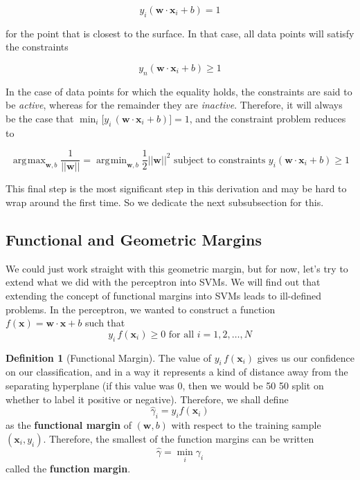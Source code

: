 \documentclass{article}
\DeclareMathOperator*{\argmin}{\arg\!\min}
\DeclareMathOperator*{\argmax}{\arg\!\max}
\theoremstyle{definition}
\newtheorem{definition}{Definition}[section]
\begin{document}
  \begin{equation*}
    y_i ( \mathbf{w} \cdot \mathbf{x}_i + b ) = 1 
  \end{equation*}
  
  for the point that is closest to the surface. In that case, all data points will satisfy the constraints 

  \begin{equation*}
    y_n (\mathbf{w} \cdot \mathbf{x}_i + b) \geq 1
  \end{equation*}

  In the case of data points for which the equality holds, the constraints are said to be \textit{active}, whereas for the remainder they are \textit{inactive}. Therefore, it will always be the case that $\min_i \big[ y_i \, (\mathbf{w} \cdot \mathbf{x}_i + b)\big] = 1$, and the constraint problem reduces to 

  \begin{equation*}
    \argmax_{\mathbf{w}, b} \frac{1}{||\mathbf{w}||} = \argmin_{\mathbf{w}, b} \frac{1}{2} ||\mathbf{w}||^2 \text{ subject to constraints } y_i (\mathbf{w} \cdot \mathbf{x}_i + b) \geq 1 
  \end{equation*}

  This final step is the most significant step in this derivation and may be hard to wrap around the first time. So we dedicate the next subsubsection for this. 

  \subsection{Functional and Geometric Margins} 

  We could just work straight with this geometric margin, but for now, let's try to extend what we did with the perceptron into SVMs. We will find out that extending the concept of functional margins into SVMs leads to ill-defined problems. In the perceptron, we wanted to construct a function $f(\mathbf{x}) = \mathbf{w} \cdot \mathbf{x} + b$ such that 
  \begin{equation*}
    y_i \, f(\mathbf{x}_i) \geq 0 \text{ for all } i = 1, 2, \ldots, N
  \end{equation*}

  \begin{definition}[Functional Margin]
    The value of $y_i \, f(\mathbf{x}_i)$ gives us our confidence on our classification, and in a way it represents a kind of distance away from the separating hyperplane (if this value was $0$, then we would be 50 50 split on whether to label it positive or negative). Therefore, we shall define 
    \begin{equation*}
        \hat{\gamma}_i = y_i f(\mathbf{x}_i) 
    \end{equation*}
  as the \textbf{functional margin} of $(\mathbf{w}, b)$ with respect to the training sample $(\mathbf{x}_i, y_i)$. Therefore, the smallest of the function margins can be written 
  \begin{equation*}
      \hat{\gamma} = \min_i \gamma_i 
  \end{equation*}
  called the \textbf{function margin}. 
  \end{definition}
\end{document}
